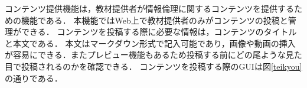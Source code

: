 コンテンツ提供機能は，教材提供者が情報倫理に関するコンテンツを提供するための機能である．
本機能ではWeb上で教材提供者のみがコンテンツの投稿と管理ができる．
コンテンツを投稿する際に必要な情報は，コンテンツのタイトルと本文である．
本文はマークダウン形式で記入可能であり，画像や動画の挿入が容易にできる．またプレビュー機能もあるため投稿する前にどの尾ような見た目で投稿されるのかを確認できる．
コンテンツを投稿する際のGUIは図\ref{teikyou}の通りである．
